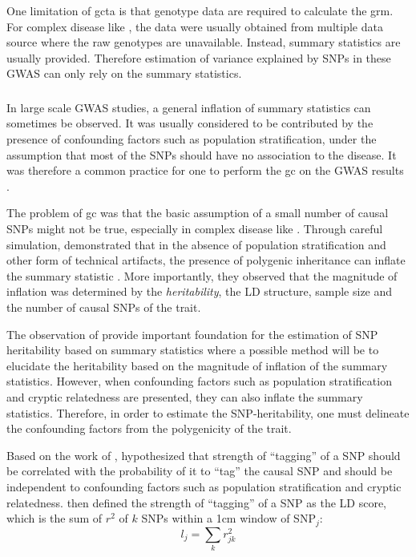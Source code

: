 \documentclass[12pt]{scrbook}
\newcommand*{\glng}{\glsentrylong}
\begin{document}
	One limitation of \gls{gcta} is that genotype data are required to calculate the \gls{grm}.
	For complex disease like \glng{scz}, the data were usually obtained from multiple data source where the raw genotypes are unavailable.
	Instead, summary statistics are usually provided.
	Therefore estimation of variance explained by \glspl{SNP} in these \gls{GWAS} can only rely on the summary statistics. 
	
	\subsubsection{\glng{ldsc}}
	In large scale \gls{GWAS} studies, a general inflation of summary statistics can sometimes be observed.
	It was usually considered to be contributed by the presence of confounding factors such as population stratification, under the assumption that most of the \glspl{SNP} should have no association to the disease.
	It was therefore a common practice for one to perform the \gls{gc} on the \gls{GWAS} results \citep{Zheng2006}.
	
	The problem of \gls{gc} was that the basic assumption of a small number of causal \glspl{SNP} might not be true, especially in complex disease like \glng{scz}.
	Through careful simulation, \citet{Yang2011b} demonstrated that in the absence of population stratification and other form of technical artifacts, the presence of polygenic inheritance can inflate the summary statistic \citep{Yang2011b}.
	More importantly, they observed that the magnitude of inflation was determined by the \emph{heritability}, the \gls{LD} structure, sample size and the number of causal \glspl{SNP} of the trait.
	
	The observation of \citet{Yang2011b} provide important foundation for the estimation of \gls{SNP} heritability based on summary statistics where a possible method will be to elucidate the heritability based on the magnitude of inflation of the summary statistics. 
	However, when confounding factors such as population stratification and cryptic relatedness are presented, they can also inflate the summary statistics.
	Therefore, in order to estimate the \gls{SNP}-heritability, one must delineate the confounding factors from the polygenicity of the trait.
	
	Based on the work of \citet{Yang2011b}, \citet{Bulik-Sullivan2015} hypothesized that strength of ``tagging'' of a \gls{SNP} should be correlated with the probability of it to ``tag'' the causal \gls{SNP} and should be independent to confounding factors such as population stratification and cryptic relatedness.
	\citet{Bulik-Sullivan2015} then defined the strength of ``tagging'' of a \gls{SNP} as the \gls{LD} score, which is the sum of $r^2$ of $k$ \glspl{SNP} within a 1\gls{cm} window of \gls{SNP}$_j$:
	\begin{equation}
	l_j = \sum_kr^2_{jk}
	\label{eq:ldScore}
	\end{equation}
	
\end{document}
